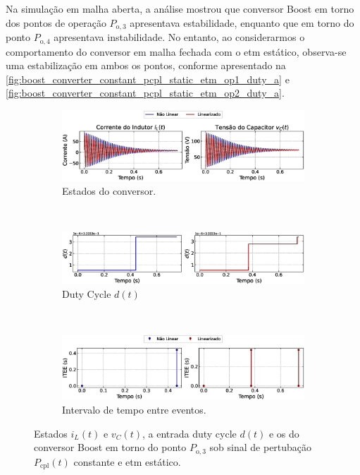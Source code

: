 Na simulação em malha aberta, a análise mostrou que conversor Boost em torno dos pontos de operação $P_{\mathrm{o}, 3}$ apresentava estabilidade, enquanto que em torno do ponto $P_{\mathrm{o}, 4}$ apresentava instabilidade. No entanto, ao considerarmos o comportamento do conversor em malha fechada com o \acrshort{etm} estático, observa-se uma estabilização em ambos os pontos, conforme apresentado na \autoref{fig:boost_converter_constant_pcpl_static_etm_op1_duty_a} e \autoref{fig:boost_converter_constant_pcpl_static_etm_op2_duty_a}. 

\begin{figure}[H]
  \centering
  \captionsetup{justification=centering}
  \begin{subfigure}{1.\textwidth}
    \centering
    \includegraphics[width=1.\textwidth]{figuras/static-etm/boost/sim1/op1/result.eps}
    \caption{Estados do conversor.}
    \label{fig:boost_converter_constant_pcpl_static_etm_op1_duty_a}
  \end{subfigure}
  \\[6pt]
  \begin{subfigure}{1.\textwidth}
    \centering
    \includegraphics[width=1.\textwidth]{figuras/static-etm/boost/sim1/op1/duty-cycle.eps}
    \caption{Duty Cycle $d(t)$}
    \label{fig:boost_converter_constant_pcpl_static_etm_op1_duty_b}
  \end{subfigure}
  \\[6pt]
  \begin{subfigure}{1.\textwidth}
    \centering
    \includegraphics[width=1.\textwidth]{figuras/static-etm/boost/sim1/op1/inter-event-times.eps}
    \caption{Intervalo de tempo entre eventos.}
    \label{fig:boost_converter_constant_pcpl_static_etm_op1_duty_c}
  \end{subfigure}
  \caption{Estados $i_L(t)$ e $v_C(t)$, a entrada duty cycle $d(t)$ e os  do conversor Boost em torno do ponto $P_{\mathrm{o}, 3}$ sob sinal de pertubação $P_{\mathrm{cpl}}(t)$ constante e \acrshort{etm} estático.}
\end{figure}

